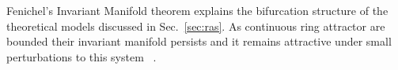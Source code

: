 \documentclass{article} %
\newcounter{ct}
\theoremstyle{definition}
\theoremstyle{remark}
\begin{document}
Fenichel's Invariant Manifold theorem explains the bifurcation structure of the theoretical models discussed in Sec.~\ref{sec:ras}.
As continuous ring attractor are bounded their invariant manifold persists and it remains attractive under small perturbations to this system ~\citep{wiggins1994}. 


\end{document}
